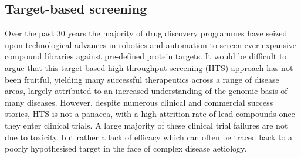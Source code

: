 \documentclass[a4paper,11pt,twoside,openright]{scrbook}
\begin{document}


\subsection{Target-based screening}
Over the past 30 years the majority of drug discovery programmes have seized upon technological advances in robotics and automation to screen ever expansive compound libraries against pre-defined protein targets.
It would be difficult to argue that this target-based high-throughput screening (HTS) approach has not been fruitful, yielding many successful therapeutics across a range of disease areas, largely attributed to an increased understanding of the genomic basis of many diseases.
However, despite numerous clinical and commercial success stories, HTS is not a panacea, with a high attrition rate of lead compounds once they enter clinical trials. \cite{Waring2015}
A large majority of these clinical trial failures are not due to toxicity, but rather a lack of efficacy which can often be traced back to a poorly hypothesised target in the face of complex disease aetiology. \cite{citation_needed}
\end{document}
